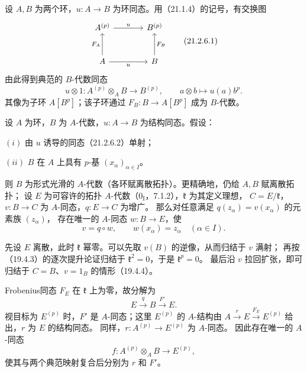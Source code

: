 设 $A,B$ 为两个环，$u:A\to B$ 为环同态。用（21.1.4）的记号，有交换图
\begin{equation}
 \begin{tikzcd}[column sep=large,row sep=large]
 A^{(p)}\arrow[r,"u"] & B^{(p)}\\
 A\arrow[u,"F_A"]\arrow[r,"u"'] & B\arrow[u,"F_B"']
 \end{tikzcd}
 \tag{21.2.6.1}
\end{equation}
由此得到典范的 $B$-代数同态
\begin{equation}
 u\otimes1:A^{(p)}\otimes_A B\longrightarrow B^{(p)},
 \qquad a\otimes b\longmapsto u(a)b^p.
 \tag{21.2.6.2}
\end{equation}
其像为子环 $A[B^p]$；该子环通过 $F_B:B\to A[B^p]$ 成为 $B$-代数。

设 $A$ 为环，$B$ 为 $A$-代数，$u:A\to B$ 为结构同态。假设：

$(i)$ 由 $u$ 诱导的同态（21.2.6.2）单射；

$(ii)$ $B$ 在 $A$ 上具有 $p$-基 $(x_\alpha)_{\alpha\in I}$。

则 $B$ 为形式光滑的 $A$-代数（各环赋离散拓扑）。更精确地，仍给 $A,B$ 赋离散拓扑；
设 $E$ 为可容许的拓扑 $A$-代数（$0_{\mathrm I}$，7.1.2），$\mathfrak k$ 为其定义理想，
$C=E/\mathfrak k$，$v:B\to C$ 为 $A$-同态，$q:E\to C$ 为增广。
那么对任意满足 $q(z_\alpha)=v(x_\alpha)$ 的元素族 $(z_\alpha)$，
存在唯一的 $A$-同态 $w:B\to E$，使
\[
 v=q\circ w,\qquad w(x_\alpha)=z_\alpha\quad(\alpha\in I).
\]

\eproof
先设 $E$ 离散，此时 $\mathfrak k$ 幂零。可以先取 $v(B)$ 的逆像，从而归结于 $v$ 满射；
再按（19.4.3）的逐次提升论证归结于 $\mathfrak k^2=0$，于是 $\mathfrak k^p=0$。
最后沿 $v$ 拉回扩张，即可归结于 $C=B$、$v=1_B$ 的情形（19.4.4）。

Frobenius同态 $F_E$ 在 $\mathfrak k$ 上为零，故分解为
\[
 E\xrightarrow q B\xrightarrow{F'}E.
\]
视目标为 $E^{(p)}$ 时，$F'$ 是 $A$-同态；这里 $E^{(p)}$ 的 $A$-结构由
$A\xrightarrow r E\xrightarrow{F_E}E^{(p)}$ 给出，$r$ 为 $E$ 的结构同态。
同样，$r:A^{(p)}\to E^{(p)}$ 为 $A$-同态。
因此存在唯一的 $A$-同态
\[
 f:A^{(p)}\otimes_A B\longrightarrow E^{(p)},
\]
使其与两个典范映射复合后分别为 $r$ 和 $F'$。

